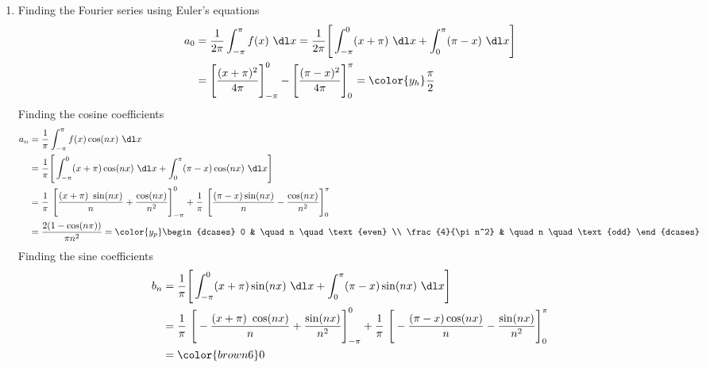 \begin{enumerate}
    \item Finding the Fourier series using Euler's equations
          \begin{align}
              a_0 & = \frac{1}{2\pi} \int_{-\pi}^{\pi} f(x)\ \dl x
              = \frac{1}{2\pi} \Bigg[\int_{-\pi}^{0} (x + \pi)\ \dl x
              +  \int_{0}^{\pi} (\pi - x)\ \dl x\Bigg]                \\
                  & = \Bigg[ \frac{(x + \pi)^2}{4\pi} \Bigg]_{-\pi}^0
              - \Bigg[ \frac{(\pi - x)^2}{4\pi} \Bigg]_0^{\pi}
              = \color{y_h} \frac{\pi}{2}
          \end{align}
          Finding the cosine coefficients
          \begin{align}
              a_n & = \frac{1}{\pi} \int_{-\pi}^{\pi} f(x) \cos(nx)\ \dl x          \\
                  & = \frac{1}{\pi} \Bigg[\int_{-\pi}^{0} (x + \pi) \cos(nx)\ \dl x
              +  \int_{0}^{\pi} (\pi - x) \cos(nx)\ \dl x\Bigg]                     \\
                  & = \frac{1}{\pi}\ \Bigg[ \frac{(x + \pi)\ \sin(nx)}{n}
                  + \frac{\cos(nx)}{n^2} \Bigg]_{-\pi}^{0}
              + \frac{1}{\pi}\ \Bigg[\frac{(\pi - x) \sin(nx)}{n}
              - \frac{\cos(nx)}{n^2} \Bigg]_0^{\pi}                                 \\
                  & = \frac{2(1 - \cos(n\pi))}{\pi n^2}
              = \color{y_p} \begin{dcases}
                                0                 & \quad n \quad \text{even} \\
                                \frac{4}{\pi n^2} & \quad n \quad \text{odd}
                            \end{dcases}
          \end{align}
          Finding the sine coefficients
          \begin{align}
              b_n & = \frac{1}{\pi} \Bigg[\int_{-\pi}^{0} (x + \pi) \sin(nx)\ \dl x
              +  \int_{0}^{\pi} (\pi - x) \sin(nx)\ \dl x\Bigg]                     \\
                  & = \frac{1}{\pi}\ \Bigg[ -\frac{(x + \pi)\ \cos(nx)}{n}
                  + \frac{\sin(nx)}{n^2} \Bigg]_{-\pi}^{0}
              + \frac{1}{\pi}\ \Bigg[-\frac{(\pi - x) \cos(nx)}{n}
              - \frac{\sin(nx)}{n^2} \Bigg]_{0}^{\pi}                               \\
                  & = \color{brown6} 0
          \end{align}

\end{enumerate}
